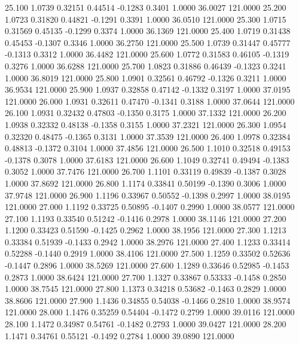   25.100   1.0739   0.32151   0.44514  -0.1283   0.3401   1.0000  36.0027 121.0000
  25.200   1.0723   0.31820   0.44821  -0.1291   0.3391   1.0000  36.0510 121.0000
  25.300   1.0715   0.31569   0.45135  -0.1299   0.3374   1.0000  36.1369 121.0000
  25.400   1.0719   0.31438   0.45453  -0.1307   0.3346   1.0000  36.2750 121.0000
  25.500   1.0739   0.31447   0.45777  -0.1313   0.3312   1.0000  36.4482 121.0000
  25.600   1.0772   0.31583   0.46105  -0.1319   0.3276   1.0000  36.6288 121.0000
  25.700   1.0823   0.31886   0.46439  -0.1323   0.3241   1.0000  36.8019 121.0000
  25.800   1.0901   0.32561   0.46792  -0.1326   0.3211   1.0000  36.9534 121.0000
  25.900   1.0937   0.32858   0.47142  -0.1332   0.3197   1.0000  37.0195 121.0000
  26.000   1.0931   0.32611   0.47470  -0.1341   0.3188   1.0000  37.0644 121.0000
  26.100   1.0931   0.32432   0.47803  -0.1350   0.3175   1.0000  37.1332 121.0000
  26.200   1.0938   0.32332   0.48138  -0.1358   0.3155   1.0000  37.2321 121.0000
  26.300   1.0954   0.32320   0.48475  -0.1365   0.3131   1.0000  37.3539 121.0000
  26.400   1.0978   0.32384   0.48813  -0.1372   0.3104   1.0000  37.4856 121.0000
  26.500   1.1010   0.32518   0.49153  -0.1378   0.3078   1.0000  37.6183 121.0000
  26.600   1.1049   0.32741   0.49494  -0.1383   0.3052   1.0000  37.7476 121.0000
  26.700   1.1101   0.33119   0.49839  -0.1387   0.3028   1.0000  37.8692 121.0000
  26.800   1.1174   0.33841   0.50199  -0.1390   0.3006   1.0000  37.9748 121.0000
  26.900   1.1196   0.33967   0.50552  -0.1398   0.2997   1.0000  38.0195 121.0000
  27.000   1.1192   0.33725   0.50895  -0.1407   0.2990   1.0000  38.0577 121.0000
  27.100   1.1193   0.33540   0.51242  -0.1416   0.2978   1.0000  38.1146 121.0000
  27.200   1.1200   0.33423   0.51590  -0.1425   0.2962   1.0000  38.1956 121.0000
  27.300   1.1213   0.33384   0.51939  -0.1433   0.2942   1.0000  38.2976 121.0000
  27.400   1.1233   0.33414   0.52288  -0.1440   0.2919   1.0000  38.4106 121.0000
  27.500   1.1259   0.33502   0.52636  -0.1447   0.2896   1.0000  38.5269 121.0000
  27.600   1.1289   0.33646   0.52985  -0.1453   0.2873   1.0000  38.6424 121.0000
  27.700   1.1327   0.33867   0.53333  -0.1458   0.2850   1.0000  38.7545 121.0000
  27.800   1.1373   0.34218   0.53682  -0.1463   0.2829   1.0000  38.8606 121.0000
  27.900   1.1436   0.34855   0.54038  -0.1466   0.2810   1.0000  38.9574 121.0000
  28.000   1.1476   0.35259   0.54404  -0.1472   0.2799   1.0000  39.0116 121.0000
  28.100   1.1472   0.34987   0.54761  -0.1482   0.2793   1.0000  39.0427 121.0000
  28.200   1.1471   0.34761   0.55121  -0.1492   0.2784   1.0000  39.0890 121.0000
